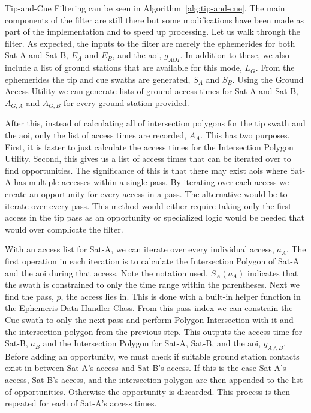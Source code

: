 Tip-and-Cue Filtering can be seen in Algorithm~\ref{alg:tip-and-cue}. The main
components of the filter are still there but some modifications have been made
as part of the implementation and to speed up processing. Let us walk through
the filter. As expected, the inputs to the filter are merely the ephemerides
for both Sat-A and Sat-B, $E_A$ and $E_B$, and the \gls{aoi}, $g_{AOI}$. In
addition to these, we also include a list of ground stations that are available
for this mode, $L_G$. From the ephemerides the tip and cue swaths are
generated, $S_A$ and $S_B$.  Using the Ground Access Utility we can generate
lists of ground access times for Sat-A and Sat-B, $A_{G,A}$ and $A_{G,B}$ for
every ground station provided. 

After this, instead of calculating all of intersection polygons for the tip
swath and the \gls{aoi}, only the list of access times are recorded, $A_A$.
This has two purposes.  First, it is faster to just calculate the access times
for the Intersection Polygon Utility. Second, this gives us a list of access
times that can be iterated over to find opportunities. The significance of this
is that there may exist \glspl{aoi} where Sat-A has multiple accesses within a
single pass. By iterating over each access we create an opportunity for every
access in a pass.  The alternative would be to iterate over every pass. This
method would either require taking only the first access in the tip pass as an
opportunity or specialized logic would be needed that would over complicate the
filter.

With an access list for Sat-A, we can iterate over every individual access,
$a_A$. The first operation in each iteration is to calculate the Intersection
Polygon of Sat-A and the \gls{aoi} during that access. Note the notation used,
$S_A(a_A)$ indicates that the swath is constrained to only the time range
within the parentheses. Next we find the pass, $p$, the access lies in.  This
is done with a built-in helper function in the Ephemeris Data Handler Class.
From this pass index we can constrain the Cue swath to only the next pass and perform
Polygon Intersection with it and the intersection polygon from the previous
step. This outputs the access time for Sat-B, $a_B$ and the Intersection
Polygon for Sat-A, Sat-B, and the \gls{aoi}, $g_{A \wedge B}$. Before adding an
opportunity, we must check if suitable ground station contacts exist in between
Sat-A's access and Sat-B's access. If this is the case Sat-A's access, Sat-B's
access, and the intersection polygon are then appended to the list of
opportunities. Otherwise the opportunity is discarded. This process is then
repeated for each of Sat-A's access times.

